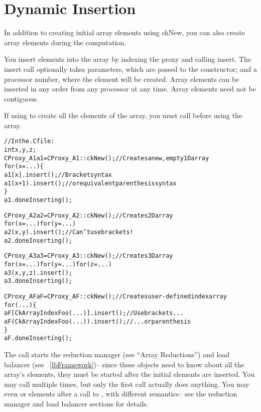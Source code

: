 \section{Dynamic Insertion}
\label{dynamic_insertion}

In addition to creating initial array elements using ckNew,
you can also
create array elements during the computation.

You insert elements into the array by indexing the proxy
and calling insert.  The insert call optionally takes 
parameters, which are passed to the constructor; and a
processor number, where the element will be created.
Array elements can be inserted in any order from 
any processor at any time.  Array elements need not 
be contiguous.

If using  to create all the elements of the array,
you must call  before using
the array.

\begin{alltt}
//In the .C file:
int x,y,z;
CProxy_A1 a1=CProxy_A1::ckNew();  //Creates a new, empty 1D array
for (x=...) \{
   a1[x  ].insert();  //Bracket syntax
   a1(x+1).insert();  // or equivalent parenthesis syntax
\}
a1.doneInserting();

CProxy_A2 a2=CProxy_A2::ckNew();   //Creates 2D array
for (x=...) for (y=...)
   a2(x,y).insert();  //Can't use brackets!
a2.doneInserting();

CProxy_A3 a3=CProxy_A3::ckNew();   //Creates 3D array
for (x=...) for (y=...) for (z=...)
   a3(x,y,z).insert();
a3.doneInserting();

CProxy_AF aF=CProxy_AF::ckNew();   //Creates user-defined index array
for (...) \{
   aF[CkArrayIndexFoo(...)].insert(); //Use brackets...
   aF(CkArrayIndexFoo(...)).insert(); //  ...or parenthesis
\}
aF.doneInserting();

\end{alltt}

The  call starts the reduction manager (see ``Array
Reductions'') and load balancer (see ~\ref{lbFramework})-- since
these objects need to know about all the array's elements, they
must be started after the initial elements are inserted.
You may call  multiple times, but only the first
call actually does anything.  You may even  or 
elements after a call to , with different semantics-- 
see the reduction manager and load balancer sections for details.

